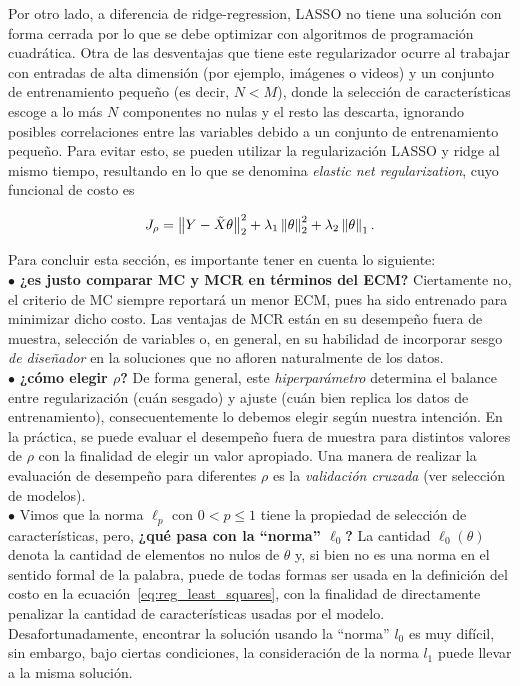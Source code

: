 Por otro lado, a diferencia de ridge-regression, LASSO no tiene una solución con forma cerrada por lo que se debe optimizar con algoritmos de programación cuadrática. Otra de las desventajas que tiene este regularizador ocurre al trabajar con entradas de alta dimensión (por ejemplo, imágenes o videos) y un conjunto de entrenamiento pequeño (es decir, $N< M$), donde la selección de características escoge a lo más $N$ componentes no nulas y el resto las descarta, ignorando posibles correlaciones entre las variables debido a un conjunto de entrenamiento pequeño. Para evitar esto, se pueden utilizar la regularización LASSO y ridge al mismo tiempo, resultando en lo que se denomina \emph{elastic net regularization}, cuyo funcional de costo es

\begin{equation}
	J_\rho = \left\lVert Y-\tilde{X}\theta\right\rVert_2^2 + \lambda_1\left\lVert\theta\right\rVert_2^2 + \lambda_2\left\lVert\theta\right\rVert_1.
\end{equation} 

\begin{mdframed}[style=discusion, frametitle={\center Consideraciones generales}]

Para concluir esta sección, es importante tener en cuenta lo siguiente:\\

$\bullet$ \textbf{¿es justo comparar MC y MCR en términos del ECM?} Ciertamente no, el criterio de MC siempre reportará un menor ECM, pues ha sido entrenado para minimizar dicho costo. Las ventajas de MCR están en su desempeño fuera de muestra, selección de variables o, en  general, en su habilidad de  incorporar  sesgo  \emph{de diseñador} en la soluciones que no afloren naturalmente de los datos. \\

$\bullet$ \textbf{¿cómo elegir $\rho$?} De forma general, este \emph{hiperparámetro} determina el balance entre regularización (cuán  sesgado) y ajuste (cuán bien replica  los datos de entrenamiento), consecuentemente lo debemos elegir según nuestra intención. En la práctica, se puede evaluar el desempeño fuera de muestra para distintos valores de $\rho$ con la finalidad de elegir un valor apropiado. Una manera de realizar la evaluación de desempeño para diferentes $\rho$ es la \emph{validación cruzada} (ver selección de modelos).\\

$\bullet$ Vimos que la norma $\ell_p$ con $0<p\leq1$ tiene la propiedad de selección de características, pero, \textbf{¿qué pasa con la ``norma'' $\ell_0$?} La cantidad  $\ell_0(\theta)$ denota la cantidad de elementos no nulos de $\theta$ y, si bien no es una norma en el sentido formal de la palabra, puede de todas formas ser usada en la definición del costo en la ecuación~\eqref{eq:reg_least_squares}, con la finalidad de directamente penalizar la cantidad de características usadas por el modelo. Desafortunadamente, encontrar la solución usando la ``norma'' $l_0$ es muy difícil, sin embargo, bajo ciertas condiciones, la consideración de la norma $l_1$ puede llevar a la misma solución.
\end{mdframed}


